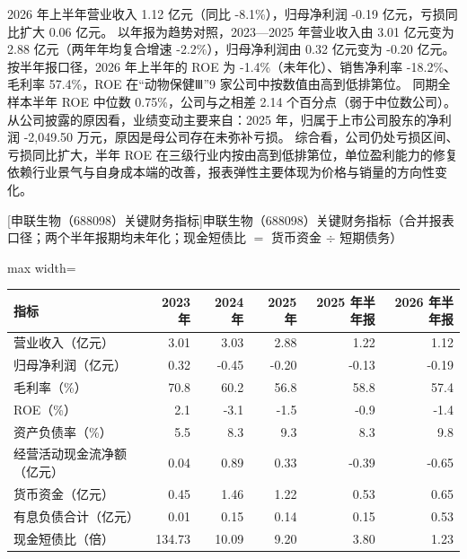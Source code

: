  2026 年上半年营业收入 1.12 亿元（同比 -8.1\%），归母净利润 -0.19 亿元，亏损同比扩大 0.06 亿元。 以年报为趋势对照，2023---2025 年营业收入由 3.01 亿元变为 2.88 亿元（两年年均复合增速 -2.2\%），归母净利润由 0.32 亿元变为 -0.20 亿元。 按半年报口径，2026 年上半年的 ROE 为 -1.4\%（未年化）、销售净利率 -18.2\%、毛利率 57.4\%，ROE 在“动物保健Ⅲ”9 家公司中按数值由高到低排第位。 同期全样本半年 ROE 中位数 0.75\%，公司与之相差 2.14 个百分点（弱于中位数公司）。 从公司披露的原因看，业绩变动主要来自：2025 年，归属于上市公司股东的净利润 -2,049.50 万元，原因是母公司存在未弥补亏损。 综合看，公司仍处亏损区间、亏损同比扩大，半年 ROE 在三级行业内按由高到低排第位，单位盈利能力的修复依赖行业景气与自身成本端的改善，报表弹性主要体现为价格与销量的方向性变化。

\begin{center}\small\setlength{\tabcolsep}{3.4pt}
[申联生物（688098）关键财务指标]{申联生物（688098）关键财务指标（合并报表口径；两个半年报期均未年化；现金短债比 $=$ 货币资金 $\div$ 短期债务）}
\begin{adjustbox}{max width=\textwidth}
\begin{tabular}{@{}lrrrrr@{}}
\toprule
指标 & 2023 年 & 2024 年 & 2025 年 & 2025 年半年报 & 2026 年半年报 \\
\midrule
营业收入（亿元） & 3.01 & 3.03 & 2.88 & 1.22 & 1.12 \\
归母净利润（亿元） & 0.32 & -0.45 & -0.20 & -0.13 & -0.19 \\
毛利率（\%） & 70.8 & 60.2 & 56.8 & 58.8 & 57.4 \\
ROE（\%） & 2.1 & -3.1 & -1.5 & -0.9 & -1.4 \\
资产负债率（\%） & 5.5 & 8.3 & 9.3 & 8.3 & 9.8 \\
经营活动现金流净额（亿元） & 0.04 & 0.89 & 0.33 & -0.39 & -0.65 \\
货币资金（亿元） & 0.45 & 1.46 & 1.22 & 0.53 & 0.65 \\
有息负债合计（亿元） & 0.01 & 0.15 & 0.14 & 0.15 & 0.53 \\
现金短债比（倍） & 134.73 & 10.09 & 9.20 & 3.80 & 1.23 \\
\bottomrule
\end{tabular}
\end{adjustbox}
\end{center}

